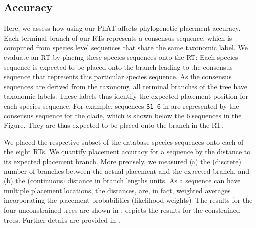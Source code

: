 \subsection{Accuracy}
\label{sec:Results:sub:Accuracy}

Here, we assess how using our \ac{PhAT} affects phylogenetic placement accuracy.
Each terminal branch of our \acp{RT} represents a consensus sequence,
which is computed from species level sequences %
that share the same taxonomic label.
We evaluate an \ac{RT} by placing these species sequences onto the \ac{RT}:
Each species sequence is expected to be placed onto the branch
leading to the consensus sequence that represents this particular species sequence.
As the consensus sequences are derived from the taxonomy, all terminal branches of the tree have taxonomic labels.
These labels thus identify the expected placement position for each species sequence.
For example, sequences \texttt{S1-6} in 
are represented by the consensus sequence for the  clade,
which is shown below the \num{6} sequences in the Figure.
They are thus expected to be placed onto the  branch in the \ac{RT}.


We placed the respective subset of the  database species sequences onto each of the eight \acp{RT}.
We quantify placement accuracy for a sequence by the distance to its expected placement branch.
More precisely, we measured (a) the (discrete) number of branches between the actual placement and the expected branch,
and (b) the (continuous) distance in branch lengths units.
As a sequence can have multiple placement locations, the distances, are, in fact, weighted averages incorporating
the placement probabilities (likelihood weights).
The results for the four unconstrained trees are shown in ;
 depicts the results for the constrained trees.
Further details are provided in .

